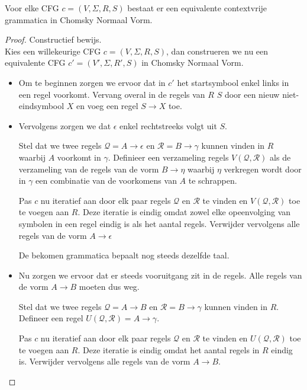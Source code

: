 \documentclass[main.tex]{subfiles}
\begin{document}
\begin{st}
  Voor elke CFG $c = (V,\Sigma,R,S)$ bestaat er een equivalente contextvrije grammatica in Chomsky Normaal Vorm.

  \begin{proof}
    Constructief bewijs.\\
    Kies een willekeurige CFG $c = (V,\Sigma,R,S)$, dan construeren we nu een equivalente CFG $c' = (V',\Sigma,R',S)$ in Chomsky Normaal Vorm.

    \begin{itemize}
    \item Om te beginnen zorgen we ervoor dat in $c'$ het startsymbool enkel links in een regel voorkomt.
      Vervang overal in de regels van $R$ $S$ door een nieuw niet-eindsymbool $X$ en voeg een regel $S\rightarrow X$ toe.
    \item Vervolgens zorgen we dat $\epsilon$ enkel rechtstreeks volgt uit $S$.

      Stel dat we twee regels $\mathcal{Q} = A \rightarrow \epsilon$ en $\mathcal{R} = B \rightarrow \gamma$ kunnen vinden in $R$ waarbij $A$ voorkomt in $\gamma$.
      Definieer een verzameling regels $V(\mathcal{Q},\mathcal{R})$ als de verzameling van de regels van de vorm $B\rightarrow \eta$ waarbij $\eta$ verkregen wordt door in $\gamma$ een combinatie van de voorkomens van $A$ te schrappen.

      Pas $c$ nu iteratief aan door elk paar regels $\mathcal{Q}$ en $\mathcal{R}$ te vinden en $V(\mathcal{Q},\mathcal{R})$ toe te voegen aan $R$.
      Deze iteratie is eindig omdat zowel elke opeenvolging van symbolen in een regel eindig is als het aantal regels.
      Verwijder vervolgens alle regels van de vorm $A\rightarrow \epsilon$
      
      De bekomen grammatica bepaalt nog steeds dezelfde taal.

    \item Nu zorgen we ervoor dat er steeds vooruitgang zit in de regels.
      Alle regels van de vorm $A\rightarrow B$ moeten dus weg.

      Stel dat we twee regels $\mathcal{Q} = A \rightarrow B$ en $\mathcal{R} = B \rightarrow \gamma$ kunnen vinden in $R$.
      Defineer een regel $U(\mathcal{Q},\mathcal{R}) = A \rightarrow \gamma$.

      Pas $c$ nu iteratief aan door elk paar regels $\mathcal{Q}$ en $\mathcal{R}$ te vinden en $U(\mathcal{Q},\mathcal{R})$ toe te voegen aan $R$.
      Deze iteratie is eindig omdat het aantal regels in $R$ eindig is.
      Verwijder vervolgens alle regels van de vorm $A\rightarrow B$.


\end{itemize}
\end{proof}
\end{st}
\end{document}
